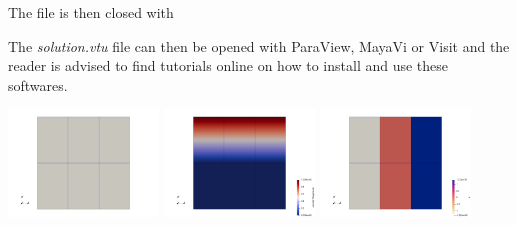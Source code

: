 

The file is then closed with



The {\sl solution.vtu} file can then be opened with ParaView, MayaVi or Visit and the reader 
is advised to find tutorials online on how to install and use these softwares. 

\begin{center}
\includegraphics[width=4cm]{images/vtk/grid}
\includegraphics[width=4cm]{images/vtk/vel}
\includegraphics[width=4cm]{images/vtk/press}
\end{center}

